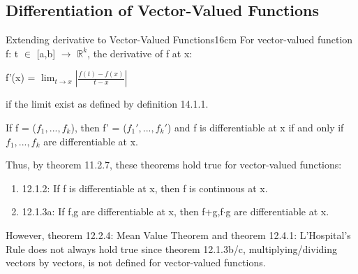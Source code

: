 \subsection{ Differentiation of Vector-Valued Functions }

    \begin{definition}{Extending derivative to Vector-Valued Functions}{16cm}
        For vector-valued function f: t $\in$ [a,b] $\rightarrow$ $\mathbb{R}^k$,
        the derivative of f at x:

        \hspace{0.5cm}
        f'(x) = $\lim_{t \rightarrow x} |\frac{f(t)-f(x)}{t-x}|$

        if the limit exist as defined by {\color{blue} definition 14.1.1}.

        \vspace{0.2cm}

        If f = ($f_1, ... , f_k$), then f' = ($f_1', ... , f_k'$)
        and f is differentiable at x if and only if $f_1, ... , f_k$ are
        differentiable at x.

        \vspace{0.1cm}

        Thus, by {\color{red} theorem 11.2.7}, these theorems hold true
        for vector-valued functions:

        \begin{enumerate}[label=-, leftmargin=0.7cm, itemsep=0.1cm]
            \item {\color{red} 12.1.2}:
                If f is differentiable at x, then f is continuous at x.
            
            \item {\color{red} 12.1.3a}:
                If f,g are differentiable at x, then f+g,f$\cdot$g
                are differentiable at x. 
        \end{enumerate}

        \vspace{0.1cm}

        However, {\color{red} theorem 12.2.4: Mean Value Theorem}
        and {\color{red} theorem 12.4.1: L'Hospital's Rule}
        does not always hold true since {\color{red} theorem 12.1.3b/c},
        multiplying/dividing vectors by vectors,
        is not defined for vector-valued functions.
    \end{definition}

    \vspace{0.5cm}



